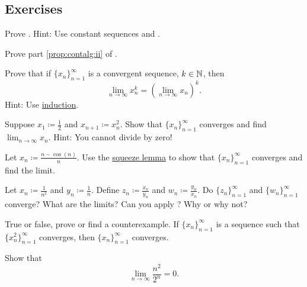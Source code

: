 \subsection{Exercises}

\begin{exercise}
Prove .  Hint: Use constant sequences
and .
\end{exercise}

\begin{exercise}
Prove part \ref{prop:contalg:ii} of .
\end{exercise}

\begin{exercise}
Prove that if $\{ x_n \}_{n=1}^\infty$ is a convergent sequence, $k \in {\mathbb{N}}$, then
\begin{equation*}
\lim_{n\to\infty} x_n^k = 
{\left( \lim_{n\to\infty} x_n \right)}^k .
\end{equation*}
Hint: Use \hyperref[induction:thm]{induction}.
\end{exercise}

\begin{exercise}
Suppose $x_1 \coloneqq \frac{1}{2}$ and $x_{n+1} \coloneqq x_n^2$.  Show that
$\{ x_n \}_{n=1}^\infty$ converges and find
$\lim_{n\to\infty} x_n$.  Hint: You cannot divide by zero!
\end{exercise}

\begin{exercise}
Let $x_n \coloneqq \frac{n-\cos(n)}{n}$.  Use the
\hyperref[squeeze:lemma]{squeeze lemma} to show that
$\{ x_n \}_{n=1}^\infty$ converges and find the limit.
\end{exercise}

\begin{exercise}
Let $x_n \coloneqq \frac{1}{n^2}$ and $y_n \coloneqq \frac{1}{n}$.  Define
$z_n \coloneqq \frac{x_n}{y_n}$ and 
$w_n \coloneqq \frac{y_n}{x_n}$.  Do $\{ z_n \}_{n=1}^\infty$ and $\{ w_n \}_{n=1}^\infty$
converge?  What are the limits?  Can you apply ?
Why or why not?
\end{exercise}

\begin{exercise}
True or false, prove or find a counterexample.  If $\{ x_n \}_{n=1}^\infty$ is a sequence
such that $\{ x_n^2 \}_{n=1}^\infty$ converges, then $\{ x_n \}_{n=1}^\infty$ converges.
\end{exercise}

\begin{exercise}
Show that
\begin{equation*}
\lim_{n\to\infty} \frac{n^2}{2^n} = 0 .
\end{equation*}
\end{exercise}

